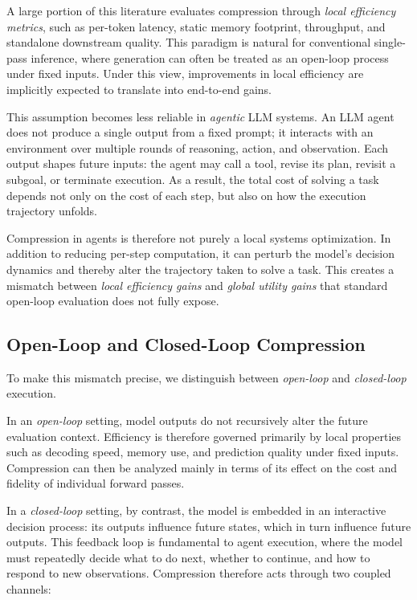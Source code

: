 \documentclass{article}
\begin{document}
A large portion of this literature evaluates compression through \emph{local efficiency metrics}, such as per-token latency, static memory footprint, throughput, and standalone downstream quality. This paradigm is natural for conventional single-pass inference, where generation can often be treated as an open-loop process under fixed inputs. Under this view, improvements in local efficiency are implicitly expected to translate into end-to-end gains.

This assumption becomes less reliable in \emph{agentic} LLM systems. An LLM agent does not produce a single output from a fixed prompt; it interacts with an environment over multiple rounds of reasoning, action, and observation. Each output shapes future inputs: the agent may call a tool, revise its plan, revisit a subgoal, or terminate execution. As a result, the total cost of solving a task depends not only on the cost of each step, but also on how the execution trajectory unfolds.

Compression in agents is therefore not purely a local systems optimization. In addition to reducing per-step computation, it can perturb the model's decision dynamics and thereby alter the trajectory taken to solve a task. This creates a mismatch between \emph{local efficiency gains} and \emph{global utility gains} that standard open-loop evaluation does not fully expose.

\subsection{Open-Loop and Closed-Loop Compression}

To make this mismatch precise, we distinguish between \emph{open-loop} and \emph{closed-loop} execution.

In an \emph{open-loop} setting, model outputs do not recursively alter the future evaluation context. Efficiency is therefore governed primarily by local properties such as decoding speed, memory use, and prediction quality under fixed inputs. Compression can then be analyzed mainly in terms of its effect on the cost and fidelity of individual forward passes.

In a \emph{closed-loop} setting, by contrast, the model is embedded in an interactive decision process: its outputs influence future states, which in turn influence future outputs. This feedback loop is fundamental to agent execution, where the model must repeatedly decide what to do next, whether to continue, and how to respond to new observations. Compression therefore acts through two coupled channels:
\end{document}
